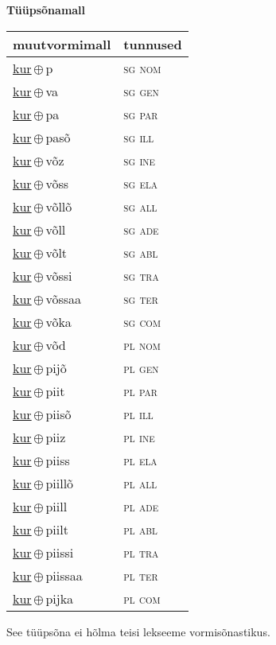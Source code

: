 

\vspace{3.5em}
\noindent \begin{minipage}{\textwidth}
\noindent \textbf{Tüüpsõnamall \,}\\

\begin{sideways}
\begin{tabular}{l l}
muutvormimall & tunnused \\
\hline
\underline{kur}\,$\oplus$\,p & \textsc{ sg nom } \\
\underline{kur}\,$\oplus$\,va & \textsc{ sg gen } \\
\underline{kur}\,$\oplus$\,pa & \textsc{ sg par } \\
\underline{kur}\,$\oplus$\,pasõ & \textsc{ sg ill } \\
\underline{kur}\,$\oplus$\,võz & \textsc{ sg ine } \\
\underline{kur}\,$\oplus$\,võss & \textsc{ sg ela } \\
\underline{kur}\,$\oplus$\,võllõ & \textsc{ sg all } \\
\underline{kur}\,$\oplus$\,võll & \textsc{ sg ade } \\
\underline{kur}\,$\oplus$\,võlt & \textsc{ sg abl } \\
\underline{kur}\,$\oplus$\,võssi & \textsc{ sg tra } \\
\underline{kur}\,$\oplus$\,võssaa & \textsc{ sg ter } \\
\underline{kur}\,$\oplus$\,võka & \textsc{ sg com } \\
\underline{kur}\,$\oplus$\,võd & \textsc{ pl nom } \\
\underline{kur}\,$\oplus$\,pijõ & \textsc{ pl gen } \\
\underline{kur}\,$\oplus$\,piit & \textsc{ pl par } \\
\underline{kur}\,$\oplus$\,piisõ & \textsc{ pl ill } \\
\underline{kur}\,$\oplus$\,piiz & \textsc{ pl ine } \\
\underline{kur}\,$\oplus$\,piiss & \textsc{ pl ela } \\
\underline{kur}\,$\oplus$\,piillõ & \textsc{ pl all } \\
\underline{kur}\,$\oplus$\,piill & \textsc{ pl ade } \\
\underline{kur}\,$\oplus$\,piilt & \textsc{ pl abl } \\
\underline{kur}\,$\oplus$\,piissi & \textsc{ pl tra } \\
\underline{kur}\,$\oplus$\,piissaa & \textsc{ pl ter } \\
\underline{kur}\,$\oplus$\,pijka & \textsc{ pl com } \\
\end{tabular}
\end{sideways}
\label{tab:tüüpsõnamall-kurp}

\end{minipage}

 
\vspace{1em}
\noindent See tüüpsõna ei hõlma teisi lekseeme vormi\-sõnastikus.
